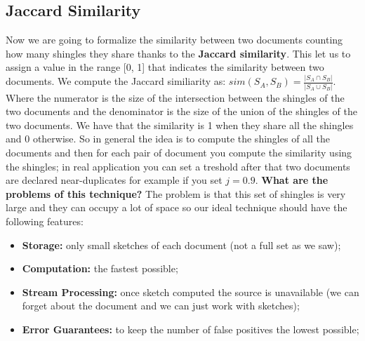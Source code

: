 \subsection{Jaccard Similarity}
Now we are going to formalize the similarity between two documents counting how many shingles they share thanks to the \textbf{Jaccard similarity}. This let us to assign a value in the range [0, 1] that indicates the similarity between two documents.\newline
We compute the Jaccard similiarity as: $sim(S_A,S_B)=\frac{|S_A \cap S_B|}{|S_A \cup S_B|}$. Where the numerator is the size of the intersection between the shingles of the two documents and the denominator is the size of the union of the shingles of the two documents. We have that the similarity is 1 when they share all the shingles and 0 otherwise.\newline
So in general the idea is to compute the shingles of all the documents and then for each pair of document you compute the similarity using the shingles; in real application you can set a treshold after that two documents are declared near-duplicates for example if you set $j=0.9$.\newline
\textbf{What are the problems of this technique?} The problem is that this set of shingles is very large and they can occupy a lot of space so our ideal technique should have the following features:
\begin{itemize}
    \item \textbf{Storage:} only small sketches of each document (not a full set as we saw);
    \item \textbf{Computation:} the fastest possible;
    \item \textbf{Stream Processing:} once sketch computed the source is unavailable (we can forget about the document and we can just work with sketches);
    \item \textbf{Error Guarantees:} to keep the number of false positives the lowest possible;
\end{itemize}
